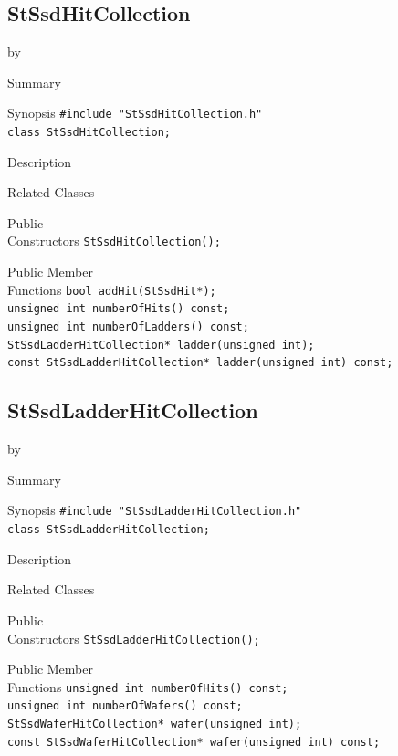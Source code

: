 \documentclass[twoside]{article}
\newcommand{\entrylabel}[1]{\mbox{\textbf{{#1}}}\hfil}%
\newenvironment{entry}
{\begin{list}{}%
    {\renewcommand{\makelabel}{\entrylabel}%
     \setlength{\labelwidth}{90pt}%
     \setlength{\leftmargin}{\labelwidth}
     \advance\leftmargin by \labelsep%
      }%
    }%
  {\end{list}}
\newcommand{\Entrylabel}[1]%
{\raisebox{0pt}[1ex][0pt]{\makebox[\labelwidth][l]%
    {\parbox[t]{\labelwidth}{\hspace{0pt}\textbf{{#1}}}}}}
\newenvironment{Entry}%
{\renewcommand{\entrylabel}{\Entrylabel}\begin{entry}}%
  {\end{entry}}
\begin{document}
\subsection{StSsdHitCollection}
\label{sec:StSsdHitCollection}
\begin{Entry}
\item[Summary]
\item[Synopsis]
    \verb+#include "StSsdHitCollection.h"+\\
    \verb+class StSsdHitCollection;+\\
\item[Description]
\item[Related Classes]
\item[Public\\ Constructors]
    \verb+StSsdHitCollection();+\\
\item[Public Member\\ Functions]
    \verb+bool addHit(StSsdHit*);+\\
    \verb+unsigned int numberOfHits() const;+\\
    \verb+unsigned int numberOfLadders() const;+\\
    \verb+StSsdLadderHitCollection* ladder(unsigned int);+\\
    \verb+const StSsdLadderHitCollection* ladder(unsigned int) const;+\\
\end{Entry}
\clearpage

\subsection{StSsdLadderHitCollection}
\label{sec:StSsdLadderHitCollection}
\begin{Entry}
\item[Summary]
\item[Synopsis]
    \verb+#include "StSsdLadderHitCollection.h"+\\
    \verb+class StSsdLadderHitCollection;+\\
\item[Description]
\item[Related Classes]
\item[Public\\ Constructors]
    \verb+StSsdLadderHitCollection();+\\
\item[Public Member\\ Functions]
    \verb+unsigned int numberOfHits() const;+\\
    \verb+unsigned int numberOfWafers() const;+\\
    \verb+StSsdWaferHitCollection* wafer(unsigned int);+\\
    \verb+const StSsdWaferHitCollection* wafer(unsigned int) const;+\\
\end{Entry}
\clearpage
\end{document}
